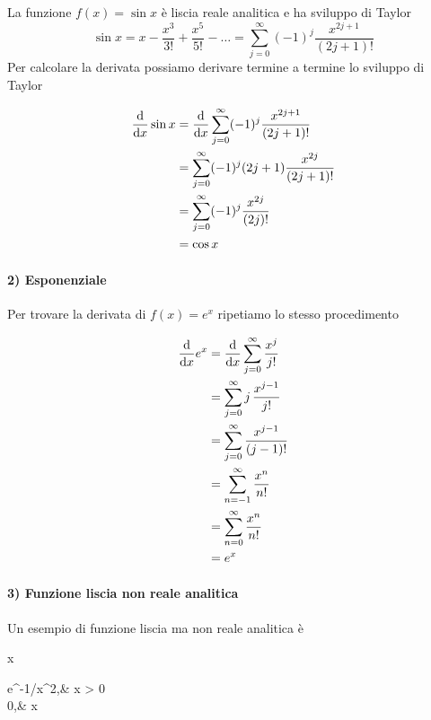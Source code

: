 La funzione $ f (x) = \sin x $ è liscia reale analitica e ha sviluppo di Taylor
%
\begin{equation}
	\sin x = x - \dfrac{x^{3}}{3!} + \dfrac{x^{5}}{5!} - \dots = \sum_{j=0}^{\infty} (-1)^{j} \dfrac{x^{2j+1}}{(2j+1)!}
\end{equation}
Per calcolare la derivata possiamo derivare termine a termine lo sviluppo di Taylor

\begin{align}
	\begin{split}
		\dv{x} \sin x &= \dv{x} \sum_{j=0}^{\infty} (-1)^{j} \dfrac{x^{2j+1}}{(2j+1)!} \\
		&= \sum_{j=0}^{\infty} (-1)^{j} (2j+1) \dfrac{x^{2j}}{(2j+1)!} \\
		&= \sum_{j=0}^{\infty} (-1)^{j} \dfrac{x^{2j}}{(2j)!} \\
		&= \cos x
	\end{split}
\end{align}

\paragraph{2) Esponenziale}

Per trovare la derivata di $ f(x) = e^{x} $ ripetiamo lo stesso procedimento

\begin{align}
	\begin{split}
		\dv{x} e^{x} &= \dv{x} \sum_{j=0}^{\infty}\dfrac{x^{j}}{j!} \\
		&= \sum_{j=0}^{\infty} j \, \dfrac{x^{j-1}}{j!} \\
		&= \sum_{j=0}^{\infty} \dfrac{x^{j-1}}{(j-1)!} \\
		&= \sum_{n=-1}^{\infty} \dfrac{x^{n}}{n!} \\
		&= \sum_{n=0}^{\infty} \dfrac{x^{n}}{n!} \\
		&= e^{x}
	\end{split}
\end{align}

\paragraph{3) Funzione liscia non reale analitica}

Un esempio di funzione liscia ma non reale analitica è

	{\R}{\R}
	{x}{%
		\begin{cases}
			e^{-1/x^{2}},&  x > 0 \\
			0,&  x 
		\end{cases}
		}

